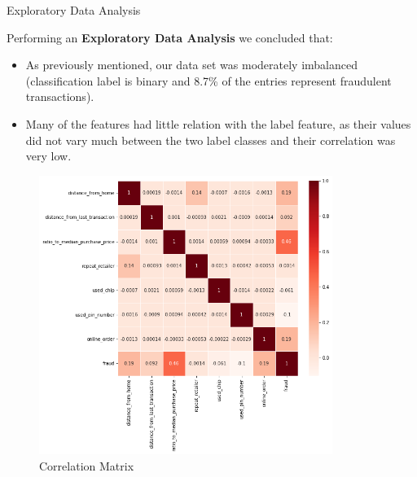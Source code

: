 \begin{frame}{Exploratory Data Analysis}

    \begin{minipage}{0.5\textwidth}
        Performing an \textbf{Exploratory Data Analysis} we concluded that:
        \begin{itemize}
            \item As previously mentioned, our data set was moderately imbalanced (classification label is binary and 8.7\% of the entries represent fraudulent transactions).
            \item Many of the features had little relation with the label feature, as their values did not vary much between the two label classes and their correlation was very low. 
        \end{itemize}
    \end{minipage}%
    \begin{minipage}{0.5\textwidth}
        \begin{figure}
            \centering
            \includegraphics[width=0.85\textwidth]{images/output.png}
            \caption{Correlation Matrix}
            \label{fig:my_label}
        \end{figure}
    \end{minipage}

    
    
    
\end{frame}